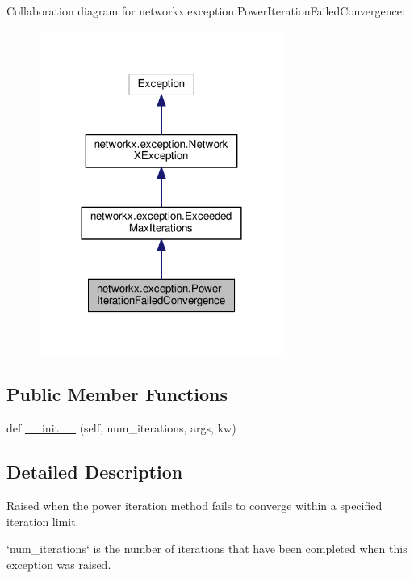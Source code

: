Collaboration diagram for networkx.\+exception.\+Power\+Iteration\+Failed\+Convergence\+:
\nopagebreak
\begin{figure}[H]
\begin{center}
\leavevmode
\includegraphics[width=228pt]{classnetworkx_1_1exception_1_1PowerIterationFailedConvergence__coll__graph}
\end{center}
\end{figure}
\subsection*{Public Member Functions}
\begin{DoxyCompactItemize}
\item 
def \hyperlink{classnetworkx_1_1exception_1_1PowerIterationFailedConvergence_ac13f5c53d61f87cb78591216735079c5}{\+\_\+\+\_\+init\+\_\+\+\_\+} (self, num\+\_\+iterations, args, kw)
\end{DoxyCompactItemize}


\subsection{Detailed Description}
\begin{DoxyVerb}Raised when the power iteration method fails to converge within a
specified iteration limit.

`num_iterations` is the number of iterations that have been
completed when this exception was raised.\end{DoxyVerb}
 

